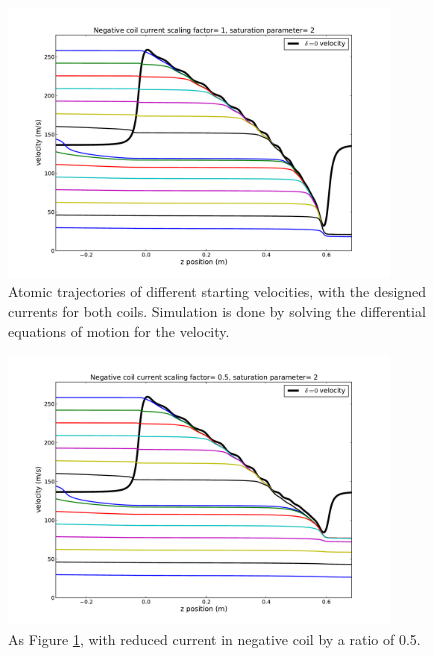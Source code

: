 \documentclass[12pt,a4paper]{article}
\begin{document}
\begin{figure}[htb]
\centering
\includegraphics[width=0.9\textwidth]{trajectory03_1}
\caption{Atomic trajectories of different starting velocities, with the designed currents for both coils. Simulation is done by solving the differential equations of motion for the velocity.}
\label{fig:trajectory1}
\end{figure}

\begin{figure}[htb]
\centering
\includegraphics[width=0.9\textwidth]{trajectory03_2}
\caption{As Figure \ref{fig:trajectory1}, with reduced current in negative coil by a ratio of 0.5.}
\label{fig:trajectory2}
\end{figure}
\end{document}
